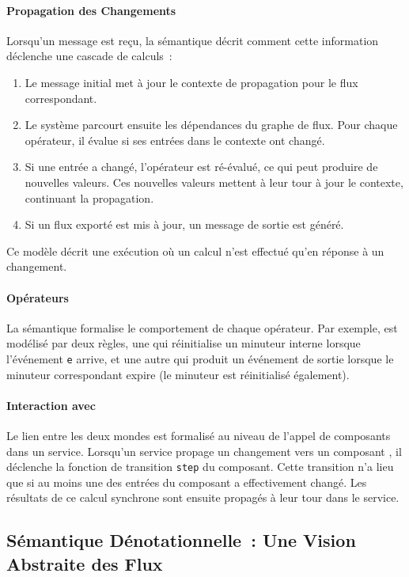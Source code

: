 \paragraph{Propagation des Changements} Lorsqu'un message est reçu, la sémantique décrit comment
cette information déclenche une cascade de calculs~:
\begin{enumerate}
      \item Le message initial met à jour le contexte de propagation pour le flux correspondant.
      \item Le système parcourt ensuite les dépendances du graphe de flux. Pour chaque opérateur, il
            évalue si ses entrées dans le contexte ont changé.
      \item Si une entrée a changé, l'opérateur est ré-évalué, ce qui peut produire de nouvelles
            valeurs. Ces nouvelles valeurs mettent à leur tour à jour le contexte, continuant la
            propagation.
      \item Si un flux exporté est mis à jour, un message de sortie est généré.
\end{enumerate}
Ce modèle décrit une exécution où un calcul n'est effectué qu'en réponse à un changement.

\paragraph{Opérateurs \GReact} La sémantique formalise le comportement de chaque opérateur. Par
exemple,  est modélisé par deux règles, une qui réinitialise
un minuteur interne lorsque l'événement \texttt{e} arrive, et une autre qui produit un événement de
sortie lorsque le minuteur correspondant expire (le minuteur est réinitialisé également).

\paragraph{Interaction avec \GRSync} Le lien entre les deux mondes est formalisé au niveau de
l'appel de composants dans un service. Lorsqu'un service \GRFRP propage un changement vers un
composant \GRSync, il déclenche la fonction de transition \texttt{step} du composant. Cette
transition n'a lieu que si au moins une des entrées du composant a effectivement changé. Les
résultats de ce calcul synchrone sont ensuite propagés à leur tour dans le service.

\subsection{Sémantique Dénotationnelle~: Une Vision Abstraite des Flux}

